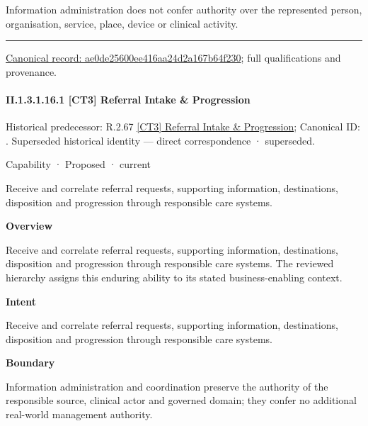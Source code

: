 Information administration does not confer authority over the represented person, organisation, service, place, device or clinical activity.



\medskip\hrule\medskip

{\footnotesize \href{../../../../../../../continuum/strategy/capability/ae0de25600ee416aa24d2a167b64f230.md}{Canonical record: ae0de25600ee416aa24d2a167b64f230}; full qualifications and provenance.}\par
\paragraph*{II.1.3.1.16.1 [CT3] Referral Intake \& Progression}
\label{navigation:II.1.3.1.16.1}

{\small Historical predecessor: R.2.67 \hyperref[element:7180f6265d5c4687a001220c6126e301]{[CT3] Referral Intake \& Progression}; Canonical ID: \texttt{}. Superseded historical identity — direct correspondence · superseded.}\par
\label{element:d11bdb9464b2476894aa372ab9b929a7}
{\small Capability · Proposed · current}\par

Receive and correlate referral requests, supporting information, destinations, disposition and progression through responsible care systems.



\textbf{Overview}



Receive and correlate referral requests, supporting information, destinations, disposition and progression through responsible care systems. The reviewed hierarchy assigns this enduring ability to its stated business-enabling context.



\textbf{Intent}



Receive and correlate referral requests, supporting information, destinations, disposition and progression through responsible care systems.



\textbf{Boundary}



Information administration and coordination preserve the authority of the responsible source, clinical actor and governed domain; they confer no additional real-world management authority.


